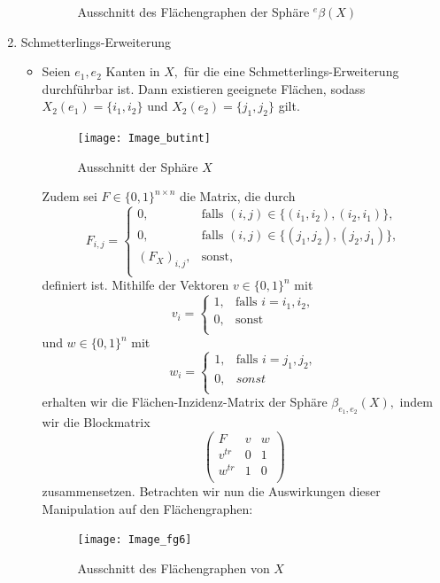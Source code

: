 \documentclass[12pt,titlepage,twoside,cleardoublepage]{article}
\theoremstyle{nummermitklammern}
\numberwithin{equation}{section}
\begin{document}
\begin{enumerate}
\begin{itemize}
\begin{figure}[H]
\caption{Ausschnitt des Flächengraphen der Sphäre ${}^e\beta(X)$}
\end{figure}
\end{itemize}
\item Schmetterlings-Erweiterung
\begin{itemize}
\item Seien $e_1,e_2$ Kanten in $X,$ für die eine Schmetterlings-Erweiterung durchführbar ist. Dann existieren geeignete Flächen, sodass $X_2(e_1)=\{i_1,i_2\}$ und $X_2(e_2)=\{j_1,j_2\}$ gilt. 
\begin{figure}[H]
\begin{center}
\texttt{[image: Image\_butint]}
\end{center}
\caption{Ausschnitt der Sphäre $X$}
\end{figure}
Zudem sei $F\in \{0,1\}^{n\times n} $ die Matrix, die durch   
\[
F_{i,j}=
\begin{cases}
0,&\text{falls }(i,j)\in \{(i_1,i_2),(i_2,i_1)\}, \\
0,&\text{falls }(i,j)\in \{(j_1,j_2),(j_2,j_1)\}, \\
(F_{X})_{i,j},& \text{sonst},\\
\end{cases}
\]
definiert ist. Mithilfe der Vektoren $v\in \{0,1\}^n $ mit 
\[
v_{i}=
\begin{cases}
1,& \text{falls }i=i_1,i_2,\\
0,& \text{sonst}\\
\end{cases}
\]
und $w\in \{0,1\}^n $ mit 
\[
w_{i}=
\begin{cases}
1,& \text{falls }i=j_1,j_2,\\
0,& sonst\\ 
\end{cases}
\]
erhalten wir die Flächen-Inzidenz-Matrix der Sphäre $\beta_{e_1,e_2}(X)
,$ indem wir die Blockmatrix 
\[
\left(
\begin{array}{c|cc} 
  F & v& w \\ 
  \hline 
  v^{tr}& 0 &1 \\
  w^{tr} &1 &0  \\
\end{array} 
\right)
\]
zusammensetzen. Betrachten wir nun die Auswirkungen dieser Manipulation auf den Flächengraphen:
\begin{figure}[H]
\begin{center}
\texttt{[image: Image\_fg6]}
\end{center}
\caption{Ausschnitt des Flächengraphen von $X$}

\end{figure}
\end{itemize}
\end{enumerate}
\end{document}
